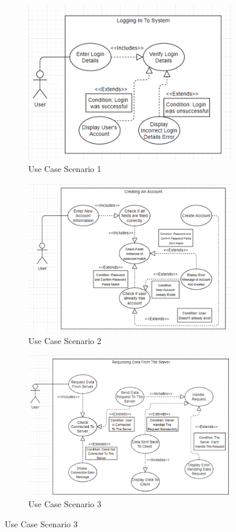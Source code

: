 \documentclass[11pt]{report}
\begin{document}
\begin{figure}[h]
\centering
\begin{subfigure}{0.5\textwidth}
	\centering	
	\includegraphics[width=0.9\linewidth]{usecase1.png}
	\caption{Use Case Scenario 1}
	\label{fig:usecase1}
\end{subfigure}%
\begin{subfigure}{0.5\textwidth}
	\centering
	\includegraphics[width=0.9\linewidth]{usecase2.png}
	\caption{Use Case Scenario 2}
	\label{fig:usecase2}
\end{subfigure}
\begin{subfigure}{0.5\textwidth}
	\includegraphics[width=0.9\linewidth]{usecase3.png}
	\caption{Use Case Scenario 3}
	\label{fig:usecase3}
\end{subfigure}


\end{figure}
\end{document}
